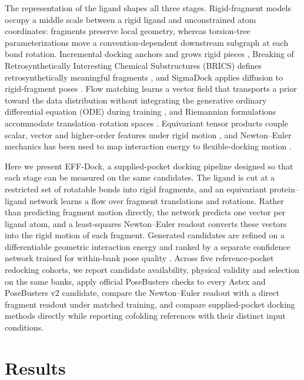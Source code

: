 \documentclass{article}
\newcommand{\method}{EFF-Dock\xspace}
\newcommand{\citep}[1]{\cite{#1}}
\begin{document}
The representation of the ligand shapes all three stages. Rigid-fragment models occupy a middle scale between a rigid ligand and unconstrained atom coordinates: fragments preserve local geometry, whereas torsion-tree parameterizations move a convention-dependent downstream subgraph at each bond rotation. Incremental docking anchors and grows rigid pieces \citep{rarey1996incremental}, Breaking of Retrosynthetically Interesting Chemical Substructures (BRICS) defines retrosynthetically meaningful fragments \citep{degen2008brics}, and SigmaDock applies diffusion to rigid-fragment poses \citep{prat2025sigmadock}. Flow matching learns a vector field that transports a prior toward the data distribution without integrating the generative ordinary differential equation (ODE) during training \citep{lipman2023flow}, and Riemannian formulations accommodate translation--rotation spaces \citep{chen2024generalgeometries,frolova2026matcha}. Equivariant tensor products couple scalar, vector and higher-order features under rigid motion \citep{liao2023equiformer}, and Newton--Euler mechanics has been used to map interaction energy to flexible-docking motion \citep{huang2024redock}.

Here we present \method, a supplied-pocket docking pipeline designed so that each stage can be measured on the same candidates. The ligand is cut at a restricted set of rotatable bonds into rigid fragments, and an equivariant protein--ligand network learns a flow over fragment translations and rotations. Rather than predicting fragment motion directly, the network predicts one vector per ligand atom, and a least-squares Newton--Euler readout converts these vectors into the rigid motion of each fragment. Generated candidates are refined on a differentiable geometric interaction energy and ranked by a separate confidence network trained for within-bank pose quality \citep{sim2026rmsdpred}. Across five reference-pocket redocking cohorts, we report candidate availability, physical validity and selection on the same banks, apply official PoseBusters checks to every Astex and PoseBusters v2 candidate, compare the Newton--Euler readout with a direct fragment readout under matched training, and compare supplied-pocket docking methods directly while reporting cofolding references with their distinct input conditions.

\FloatBarrier

\section{Results}
\label{sec:results}
\end{document}
